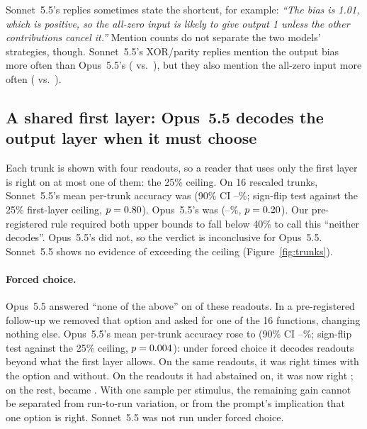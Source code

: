 \documentclass[10pt]{article}
\newcommand{\Sonnet}{Sonnet~5.5}
\newcommand{\Opus}{Opus~5.5}
\begin{document}
\Sonnet's replies sometimes state the shortcut, for example: \emph{``The bias is 1.01, which is positive, so the all-zero input is likely to give output 1 unless the other contributions cancel it.''} Mention counts do not separate the two models' strategies, though. \Sonnet's XOR/parity replies mention the output bias more often than \Opus's (\nSonXLBiasMention{} vs.\ \nOpusXLBiasMention), but they also mention the all-zero input more often (\nSonXLZeroMention{} vs.\ \nOpusXLZeroMention).

\subsection{A shared first layer: \Opus{} decodes the output layer when it must choose}
\label{sec:trunk}
Each trunk is shown with four readouts, so a reader that uses only the first layer is right on at most one of them: the 25\% ceiling. On 16 rescaled trunks, \Sonnet's mean per-trunk accuracy was \nSonTrMean{} (90\% CI \nSonTrLo--\nSonTrHi\%; sign-flip test against the 25\% first-layer ceiling, $p=0.80$). \Opus's was \nOpusTrMean{} (\nOpusTrLo--\nOpusTrHi\%, $p=0.20$). Our pre-registered rule required both upper bounds to fall below 40\% to call this ``neither decodes''. \Opus's did not, so the verdict is inconclusive for \Opus. \Sonnet{} shows no evidence of exceeding the ceiling (Figure~\ref{fig:trunks}).

\paragraph{Forced choice.} \Opus{} answered ``none of the above'' on \nOpusTrNoneR{} of these readouts. In a pre-registered follow-up we removed that option and asked for one of the 16 functions, changing nothing else. \Opus's mean per-trunk accuracy rose to \nRFiveTrMean{} (90\% CI \nRFiveTrLo--\nRFiveTrHi\%; sign-flip test against the 25\% ceiling, $p=0.004$): under forced choice it decodes readouts beyond what the first layer allows. On the same readouts, it was right \nRFiveTrWithQ{} times with the option and \nRFiveTrForced{} without. On the readouts it had abstained on, it was now right \nRFiveTrAbstRight{}; on the rest, \nRFiveTrRestWithQ{} became \nRFiveTrRestForced. With one sample per stimulus, the remaining gain cannot be separated from run-to-run variation, or from the prompt's implication that one option is right. \Sonnet{} was not run under forced choice.
\end{document}
